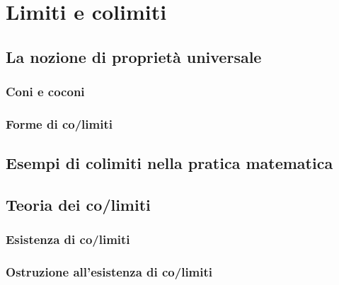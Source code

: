 \chapter{Limiti e colimiti}\label{chap_limiti_colimiti}
\section{La nozione di proprietà universale}
\begin{esercizi}
	\item \item \item \item \item
\end{esercizi}
\subsection{Coni e coconi}
\subsection{Forme di co/limiti}
\section{Esempi di colimiti nella pratica matematica}
\begin{esercizi}
	\item \item \item \item \item
\end{esercizi}
\section{Teoria dei co/limiti}
\begin{esercizi}
	\item \item \item \item \item
\end{esercizi}
\subsection{Esistenza di co/limiti}
\subsection{Ostruzione all'esistenza di co/limiti}
